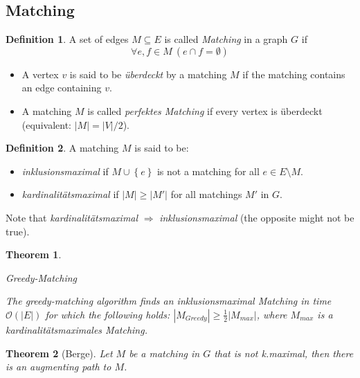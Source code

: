 \documentclass[12pt]{extarticle}
\theoremstyle{definition}
\newtheorem{definition}{Definition}
\theoremstyle{remark}
\theoremstyle{plain}
\newtheorem{theorem}{Theorem}
\newcommand{\BO}{\mathcal{O}}
\begin{document}
\subsection{Matching}

\begin{definition}
    A set of edges $M \subseteq E$ is called \textit{Matching} in a graph $G$ if
    \[ \forall e,f \in M\ (e \cap f = \emptyset) \]

    \begin{itemize}
        \item A vertex $v$ is said to be \textit{überdeckt} by a matching $M$ if the matching contains an edge containing $v$.
        \item A matching $M$ is called \textit{perfektes Matching} if every vertex is überdeckt (equivalent: $|M| = |V| / 2$).
    \end{itemize}
\end{definition}

\begin{definition}
    A matching $M$ is said to be:
    \begin{itemize}
        \item \textit{inklusionsmaximal} if $M \cup \left\{ e \right\}$ is not a matching for all $e \in E \setminus M$.
        \item \textit{kardinalitätsmaximal} if $|M| \ge |M'|$ for all matchings $M'$ in $G$.
    \end{itemize}

    Note that \textit{kardinalitätsmaximal} $\Rightarrow$ \textit{inklusionsmaximal} (the opposite might not be true).
\end{definition}

\begin{theorem}
    \begin{algorithm}
        \caption{Greedy-Matching}
    \end{algorithm}

    The greedy-matching algorithm finds an inklusionsmaximal Matching in time $\BO(|E|)$
    for which the following holds: $|M_{Greedy}| \ge \frac{1}{2} |M_{max}|$, where $M_{max}$ is a kardinalitätsmaximales Matching.
\end{theorem}

\begin{theorem}[Berge]
    Let $M$ be a matching in $G$ that is not k.maximal, then there is an augmenting path to $M$.
\end{theorem}
\end{document}
